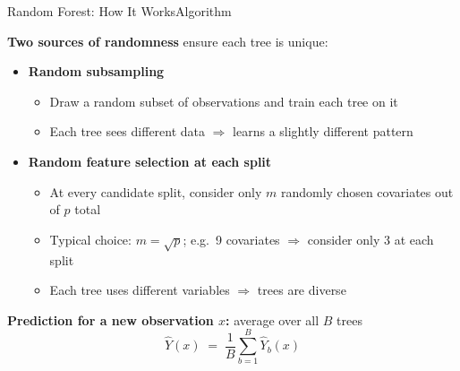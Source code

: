 \documentclass[hyperref={pdfpagelabels=false}]{beamer}
\begin{document}
\begin{frame}{Random Forest: How It Works}{Algorithm}

\textbf{Two sources of randomness} ensure each tree is unique:
\vspace{0.2cm}
\begin{itemize}
  \item[\textbf{1.}] \textbf{Random subsampling}
  \begin{itemize}
    \vspace{0.1cm}
    \item Draw a random subset of observations and train each tree on it
    \vspace{0.1cm}
    \item Each tree sees different data $\Rightarrow$ learns a slightly different pattern
  \end{itemize}
  \vspace{0.25cm}
  \item[\textbf{2.}] \textbf{Random feature selection at each split}
  \begin{itemize}
    \vspace{0.1cm}
    \item At every candidate split, consider only $m$ randomly chosen covariates out of $p$ total
    \vspace{0.1cm}
    \item Typical choice: $m = \sqrt{p}$; \enspace e.g.\ 9 covariates $\Rightarrow$ consider only 3 at each split
    \vspace{0.1cm}
    \item Each tree uses different variables $\Rightarrow$ trees are diverse
  \end{itemize}
\end{itemize}

\vspace{0.35cm}
\textbf{Prediction for a new observation $x$:} average over all $B$ trees
\begin{equation*}
  \hat{Y}(x) \;=\; \frac{1}{B}\sum_{b=1}^{B} \hat{Y}_{b}(x)
\end{equation*}
\end{frame}
\end{document}
